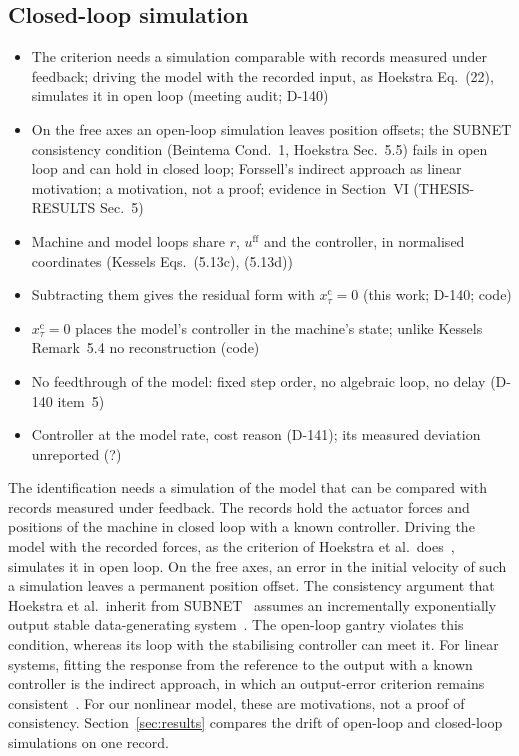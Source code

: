\subsection{Closed-loop simulation}\label{sec:aug_loop}
\ifdraft
\begin{itemize}
\item The criterion needs a simulation comparable with records measured under feedback; driving the model with the recorded input, as Hoekstra Eq.~(22), simulates it in open loop (meeting audit; D-140)
\item On the free axes an open-loop simulation leaves position offsets; the SUBNET consistency condition (Beintema Cond.~1, Hoekstra Sec.~5.5) fails in open loop and can hold in closed loop; Forssell's indirect approach as linear motivation; a motivation, not a proof; evidence in Section~VI (THESIS-RESULTS Sec.~5)
\item Machine and model loops share $r$, $u^{\mathrm{ff}}$ and the controller, in normalised coordinates (Kessels Eqs.~(5.13c), (5.13d))
\item Subtracting them gives the residual form with $x^{\mathrm c}_\tau=0$ (this work; D-140; code)
\item $x^{\mathrm c}_\tau=0$ places the model's controller in the machine's state; unlike Kessels Remark~5.4 no reconstruction (code)
\item No feedthrough of the model: fixed step order, no algebraic loop, no delay (D-140 item~5)
\item Controller at the model rate, cost reason (D-141); its measured deviation unreported (?)
\end{itemize}
\fi

The identification needs a simulation of the model that can be compared with
records measured under feedback.
The records hold the actuator forces and positions of the machine in closed
loop with a known controller.
Driving the model with the recorded forces, as the criterion of Hoekstra et
al.\ does~\cite[Eq.~(22)]{hoekstra2026lfr}, simulates it in open loop.
On the free axes, an error in the initial velocity of such a simulation
leaves a permanent position offset.
The consistency argument that Hoekstra et al.\ inherit from
SUBNET~\cite[Sec.~5.5]{hoekstra2026lfr} assumes an incrementally
exponentially output stable data-generating
system~\cite[Cond.~1]{beintema2023subnet}.
The open-loop gantry violates this condition, whereas its loop with the
stabilising controller can meet it.
For linear systems, fitting the response from the reference to the output
with a known controller is the indirect approach, in which an output-error
criterion remains consistent~\cite{forssell1999revisited}.
For our nonlinear model, these are motivations, not a proof of consistency.
Section~\ref{sec:results} compares the drift of open-loop and closed-loop
simulations on one record.

